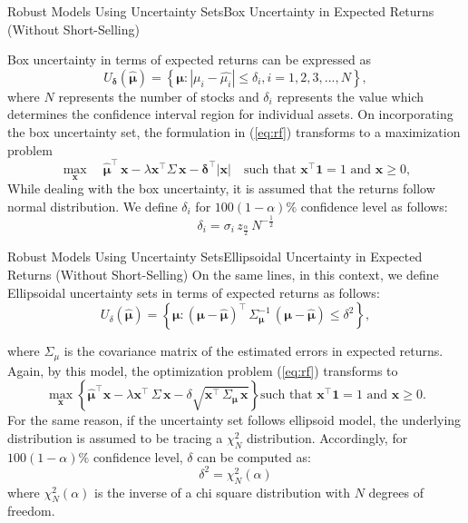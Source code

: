 \documentclass{beamer}
\begin{document}
\begin{frame}{Robust Models Using Uncertainty Sets}{Box Uncertainty in Expected Returns (Without Short-Selling)}

Box uncertainty in terms of expected returns can be expressed as 
\begin{equation}
U_{\boldsymbol{\delta}}(\boldsymbol{\hat{\mu}}) = \left\{ \boldsymbol{\mu}: | \mu_i - \hat{\mu_i}| \leq \delta_i, i = 1,2,3,...,N \right\},    
\end{equation}
where $N$ represents the number of stocks and $\delta_i$ represents the value which determines the confidence interval region for individual assets. On incorporating the box uncertainty set, the formulation in (\ref{eq:rf}) 
transforms to a maximization problem
\begin{equation}
\label{eqn:trans_eqn_box}
\max_\mathbf{x} \quad \boldsymbol{\hat{\mu}}^{\top} \, \mathbf{x}-  \lambda \mathbf{x^{\top}}\Sigma \, \mathbf{x} - \boldsymbol{\delta}^{\top}|\mathbf{x}| \quad \text{such that } \mathbf{x^{\top}}\mathbf{1}  = 1 \text{ and } \mathbf{x} \geq 0,  
\end{equation}
\vfill
While dealing with the box uncertainty, it is assumed that the returns follow normal distribution.  We define $\delta_i$ for $100(1 - \alpha)\%$ confidence level as follows: $$ \delta_i = \sigma_{i} \, z_\frac{\alpha}{2} \, N^{-\frac{1}{2}}$$
\end{frame}
\begin{frame}{Robust Models Using Uncertainty Sets}{Ellipsoidal Uncertainty in Expected Returns (Without Short-Selling)}
On the same lines, in this context, we define Ellipsoidal uncertainty sets in terms of expected returns as follows:
\begin{equation}
U_{\delta}(\boldsymbol{\hat{\mu}}) = \left\{ \boldsymbol{\mu} : (\boldsymbol{\mu} - \boldsymbol{\hat{\mu}})^{\top} \, \Sigma^{-1}_{\boldsymbol{\mu}} \, (\boldsymbol{\mu} - \boldsymbol{\hat{\mu}}) \leq \delta^2 \right\},
\end{equation}

where $\Sigma_\mu$ is the covariance matrix of the estimated errors in expected returns. Again, by this model, the optimization problem (\ref{eq:rf}) transforms to 
\begin{equation}
\max_{\mathbf{x}} \left\{ \boldsymbol{\hat{\mu}}^{\top} \mathbf{x} - \lambda \mathbf{x}^{\top} \, \Sigma \, \mathbf{x} - \delta \sqrt{\mathbf{x}^{\top} \, \Sigma_{\boldsymbol{\mu}} \, \mathbf{x}} \right\} \text{such that } \mathbf{x^{\top}} \mathbf{1}  = 1 \text{ and } \mathbf{x} \geq 0.
\end{equation}
For the same reason, if the uncertainty set follows ellipsoid model, the underlying distribution is assumed to be tracing a $\chi_N^2$ distribution. Accordingly, for $100(1-\alpha)\%$ confidence level, $\delta$ can be computed as: $$\delta^2=\chi_{N}^2(\alpha)$$
where $\chi_{N}^2(\alpha)$ is the inverse of a chi square distribution with $N$ degrees of freedom.
\end{frame}
\end{document}
